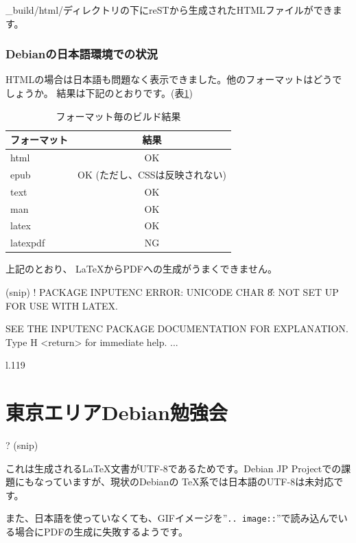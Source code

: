 \documentclass[mingoth,a4paper]{jsarticle}
\begin{document}
\_build/html/ディレクトリの下にreSTから生成されたHTMLファイルができます。

\subsection{Debianの日本語環境での状況}

HTMLの場合は日本語も問題なく表示できました。他のフォーマットはどうでしょうか。
結果は下記のとおりです。(表\ref{tab:format})

\begin{table}[h]
 \caption{フォーマット毎のビルド結果}\label{tab:format}
 \begin{center}
{\scriptsize
  \begin{tabular}{|l|c|}
    \hline
    フォーマット & 結果 \\
    \hline
    html & OK \\
    epub & OK (ただし、CSSは反映されない)\\
    text & OK \\
    man & OK \\
    latex & OK \\
    latexpdf & NG \\
    \hline
  \end{tabular}
}
 \end{center}
\end{table}

上記のとおり、 \LaTeX からPDFへの生成がうまくできません。

\begin{commandline}
(snip)
! PACKAGE INPUTENC ERROR: UNICODE CHAR \U8: NOT SET UP FOR USE WITH LATEX.

SEE THE INPUTENC PACKAGE DOCUMENTATION FOR EXPLANATION.
Type  H <return>  for immediate help.
 ...                                              
                                                  
l.119 \chapter{東京エリアDebian勉強会}
                                              
?  
(snip)
\end{commandline}

これは生成される\LaTeX 文書がUTF-8であるためです。Debian JP Projectでの課題にもなっていますが、現状のDebianの \TeX 系では日本語のUTF-8は未対応です。

また、日本語を使っていなくても、GIFイメージを''\texttt{.. image::}''で読み込んでいる場合にPDFの生成に失敗するようです。
\end{document}

